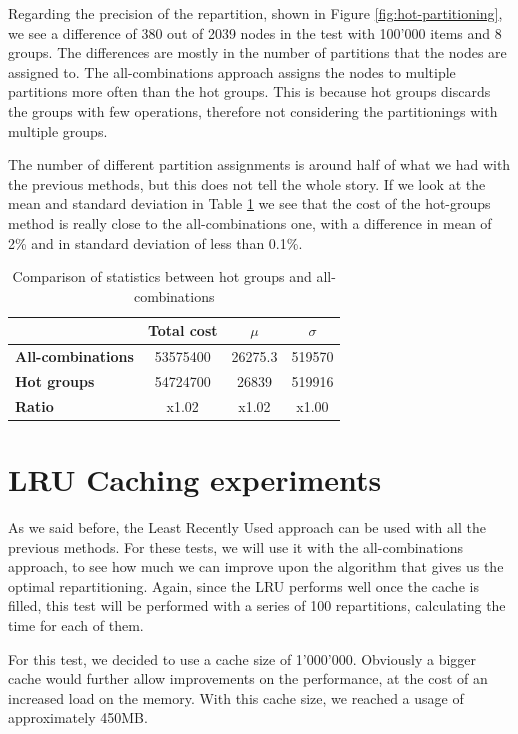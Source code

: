 Regarding the precision of the repartition, shown in Figure \ref{fig:hot-partitioning}, we see a difference of 380 out of 2039 nodes in the test with 100'000 items and 8 groups.
The differences are mostly in the number of partitions that the nodes are assigned to. The all-combinations approach assigns the nodes to multiple partitions more often than the hot groups. This is because hot groups discards the groups with few operations, therefore not considering the partitionings with multiple groups.

The number of different partition assignments is around half of what we had with the previous methods, but this does not tell the whole story. If we look at the mean and standard deviation in Table \ref{tab:mean-stddev-hot-all} we see that the cost of the hot-groups method is really close to the all-combinations one, with a difference in mean of 2\% and in standard deviation of less than 0.1\%.

\begin{table}[!htb]
  \centering
  \begin{tabular}{l c c c}
    \hline
    & \textbf{Total cost} & \textbf{$\mu$} & \textbf{$\sigma$} \\
    \hline
    \textbf{All-combinations} & 53575400 & 26275.3 & 519570\\
    \textbf{Hot groups} & 54724700 & 26839 & 519916 \\
    \hline
    \textbf{Ratio} & x1.02 & x1.02 & x1.00 \\
  \end{tabular}
  \caption{Comparison of statistics between hot groups and all-combinations}\label{tab:mean-stddev-hot-all}
\end{table}

\section{LRU Caching experiments}\label{sec:lru-caching-tests}
As we said before, the Least Recently Used approach can be used with all the previous methods. For these tests, we will use it with the all-combinations approach, to see how much we can improve upon the algorithm that gives us the optimal repartitioning. Again, since the LRU performs well once the cache is filled, this test will be performed with a series of 100 repartitions, calculating the time for each of them.

For this test, we decided to use a cache size of 1'000'000. Obviously a bigger cache would further allow improvements on the performance, at the cost of an increased load on the memory. With this cache size, we reached a usage of approximately 450MB.

